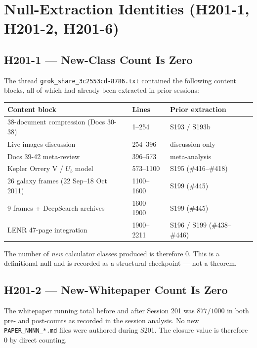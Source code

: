 \documentclass[11pt,letterpaper]{article}
\theoremstyle{definition}
\begin{document}
\section{Null-Extraction Identities (H201-1, H201-2, H201-6)}

\subsection{H201-1 --- New-Class Count Is Zero}

The thread \texttt{grok\_share\_3c2553cd-8786.txt} contained the
following content blocks, all of which had already been extracted in
prior sessions:

\begin{center}
\begin{tabular}{lll}
\toprule
Content block & Lines & Prior extraction \\
\midrule
38-document compression (Docs 30-38)        & 1--254     & S193 / S193b \\
Live-images discussion                      & 254--396   & discussion only \\
Docs 39-42 meta-review                      & 396--573   & meta-analysis  \\
Kepler Orrery V / $U_b$ model               & 573--1100  & S195 (\#416--\#418) \\
26 galaxy frames (22 Sep--18 Oct 2011)      & 1100--1600 & S199 (\#445) \\
9 frames + DeepSearch archives              & 1600--1900 & S199 (\#445) \\
LENR 47-page integration                    & 1900--2211 & S196 / S199 (\#438--\#446) \\
\bottomrule
\end{tabular}
\end{center}

\noindent The number of \emph{new} calculator classes produced is therefore
$0$. This is a definitional null and is recorded as a structural
checkpoint --- not a theorem.

\subsection{H201-2 --- New-Whitepaper Count Is Zero}

The whitepaper running total before and after Session 201 was
$877/1000$ in both pre- and post-counts as recorded in the session
analysis. No new \texttt{PAPER\_NNNN\_*.md} files were authored during
S201. The closure value is therefore $0$ by direct counting.
\end{document}
